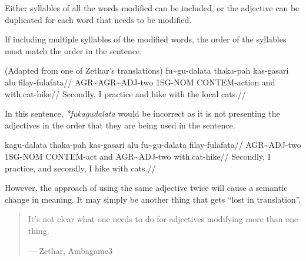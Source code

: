 Either syllables of all the words modified can be included, or the adjective can be duplicated for each word that needs to be modified.

If including multiple syllables of the modified words, the order of the syllables must match the order in the sentence.

(Adapted from one of Zethar's translations)
\ex
\begingl
\gla  fu\~{}gu-dalata       thaka-pah kas-gasari     alu filay-fulafata//
\glb  AGR\~{}AGR\~{}ADJ-two 1SG-NOM   CONTEM-action  and with.cat-hike//
\glft Secondly, I practice and hike with the local cats.//
\endgl
\xe

In this sentence, \textit{*fukagudalata} would be incorrect as it is not presenting the adjectives in the order that they are being used in the sentence.

\ex
\begingl
\gla ka{}gu-dalata thaka-pah kas-gasari alu fu\~{}gu-dalata filay-fulafata//
\glb AGR\~{}ADJ-two  1SG-NOM   CONTEM-act and AGR\~{}ADJ-two  with.cat-hike//
\glft Secondly, I practice, and secondly, I hike with cats.//
\endgl
\xe

However, the approach of using the same adjective twice will cause a semantic change in meaning.
It may simply be another thing that gets ``lost in translation''.

\begin{quote}
    It’s not clear what one needs to do for adjectives modifying more than one thing.

    --- Zethar, Ambagame3
\end{quote}